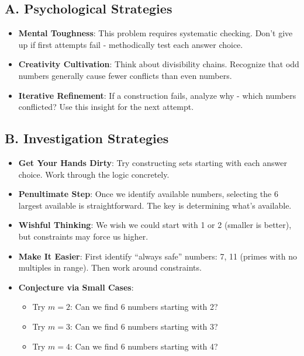 \documentclass[12pt]{article}
\begin{document}
\begin{strategicbox}
\subsection*{A. Psychological Strategies}
\begin{itemize}[leftmargin=*]
    \item \textbf{Mental Toughness}: This problem requires systematic checking. Don't give up if first attempts fail - methodically test each answer choice.
    
    \item \textbf{Creativity Cultivation}: Think about divisibility chains. Recognize that odd numbers generally cause fewer conflicts than even numbers.
    
    \item \textbf{Iterative Refinement}: If a construction fails, analyze why - which numbers conflicted? Use this insight for the next attempt.
\end{itemize}

\subsection*{B. Investigation Strategies}
\begin{itemize}[leftmargin=*]
    \item \textbf{Get Your Hands Dirty}: Try constructing sets starting with each answer choice. Work through the logic concretely.
    
    \item \textbf{Penultimate Step}: Once we identify available numbers, selecting the 6 largest available is straightforward. The key is determining what's available.
    
    \item \textbf{Wishful Thinking}: We wish we could start with 1 or 2 (smaller is better), but constraints may force us higher.
    
    \item \textbf{Make It Easier}: First identify ``always safe'' numbers: 7, 11 (primes with no multiples in range). Then work around constraints.
    
    \item \textbf{Conjecture via Small Cases}:
    \begin{itemize}
        \item Try $m = 2$: Can we find 6 numbers starting with 2?
        \item Try $m = 3$: Can we find 6 numbers starting with 3?
        \item Try $m = 4$: Can we find 6 numbers starting with 4?
    \end{itemize}
\end{itemize}


\end{strategicbox}
\end{document}
